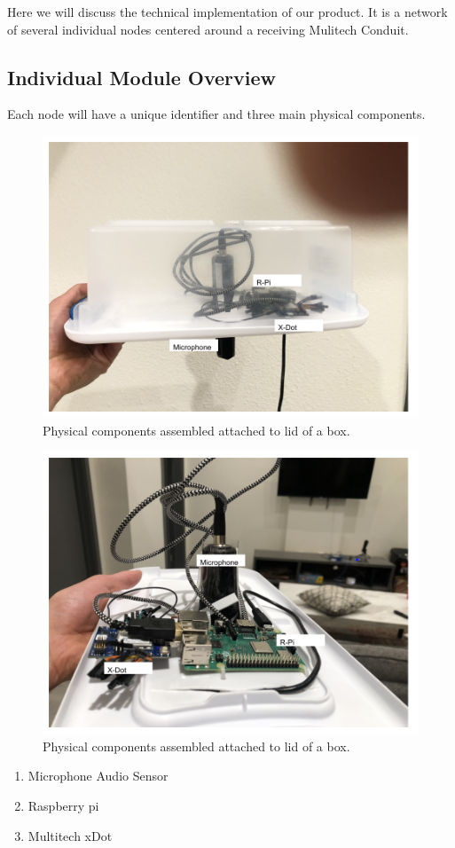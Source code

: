 \documentclass[conference]{IEEEtran}
\begin{document}
Here we will discuss the technical implementation of our product. It is a network of several individual nodes centered around a receiving Mulitech Conduit. 



\subsection{Individual Module Overview}

Each node will have a unique identifier and three main physical components.
\begin{figure}[htbp]
\centerline{\includegraphics[width=0.7\columnwidth]{physical_system_box.png}}
\caption{Physical components assembled attached to lid of a box.}
\label{fig}
\end{figure}
\begin{figure}[htbp]
\centerline{\includegraphics[width=0.7\columnwidth]{physical_system.png}}
\caption{Physical components assembled attached to lid of a box.}
\label{fig}
\end{figure}
\begin{enumerate}
\item Microphone Audio Sensor 
\item Raspberry pi
\item Multitech xDot

\end{enumerate}
\end{document}
